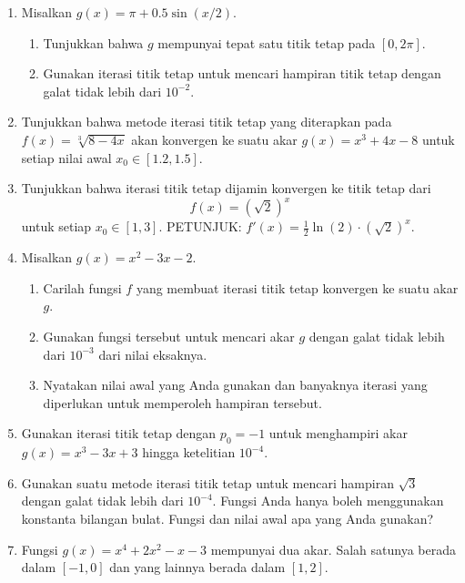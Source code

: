 \begin{enumerate}
\begin{enumerate}
\item Tunjukkan bahwa $f$ mempunyai tepat satu titik tetap pada $[-4,-0.9]$.
\item Gunakan iterasi titik tetap untuk mencari hampiran titik tetap dengan
galat tidak lebih dari $10^{-2}$.
\end{enumerate}
\item \label{enu:ShowPart2}Misalkan $g(x)=\pi+0.5\sin(x/2)$.

\begin{enumerate}
\item Tunjukkan bahwa $g$ mempunyai tepat satu titik tetap pada $[0,2\pi]$. 
\item Gunakan iterasi titik tetap untuk mencari hampiran titik tetap dengan
galat tidak lebih dari $10^{-2}$.
\end{enumerate}
\item \label{exc:fixedpt-13}Tunjukkan bahwa metode iterasi titik tetap
yang diterapkan pada $f(x)=\sqrt[3]{8-4x}$ akan konvergen ke suatu
akar $g(x)=x^{3}+4x-8$ untuk setiap nilai awal $x_{0}\in[1.2,1.5]$. \hasasolution 
\item Tunjukkan bahwa iterasi titik tetap dijamin konvergen ke titik tetap
dari
\[
f(x)=(\sqrt{2})^{x}
\]
untuk setiap $x_{0}\in[1,3]$. PETUNJUK: $f'(x)=\frac{1}{2}\ln(2)\cdot(\sqrt{2})^{x}$.
\item Misalkan $g(x)=x^{2}-3x-2$. 

\begin{enumerate}
\item Carilah fungsi $f$ yang membuat iterasi titik tetap konvergen ke
suatu akar $g$. 
\item Gunakan fungsi tersebut untuk mencari akar $g$ dengan galat tidak
lebih dari $10^{-3}$ dari nilai eksaknya.
\item Nyatakan nilai awal yang Anda gunakan dan banyaknya iterasi yang diperlukan
untuk memperoleh hampiran tersebut.
\end{enumerate}
\item Gunakan iterasi titik tetap dengan $p_{0}=-1$ untuk menghampiri akar
$g(x)=x^{3}-3x+3$ hingga ketelitian $10^{-4}$.
\item Gunakan suatu metode iterasi titik tetap untuk mencari hampiran $\sqrt{3}$
dengan galat tidak lebih dari $10^{-4}$. Fungsi Anda hanya boleh
menggunakan konstanta bilangan bulat. Fungsi dan nilai awal apa yang
Anda gunakan?
\item Fungsi $g(x)=x^{4}+2x^{2}-x-3$ mempunyai dua akar. Salah satunya
berada dalam $[-1,0]$ dan yang lainnya berada dalam $[1,2]$.


\end{enumerate}
